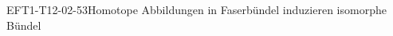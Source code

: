 
\begin{KORO}{EFT1-T12-02-53}{Homotope Abbildungen in Faserbündel induzieren isomorphe Bündel}
\end{KORO}
